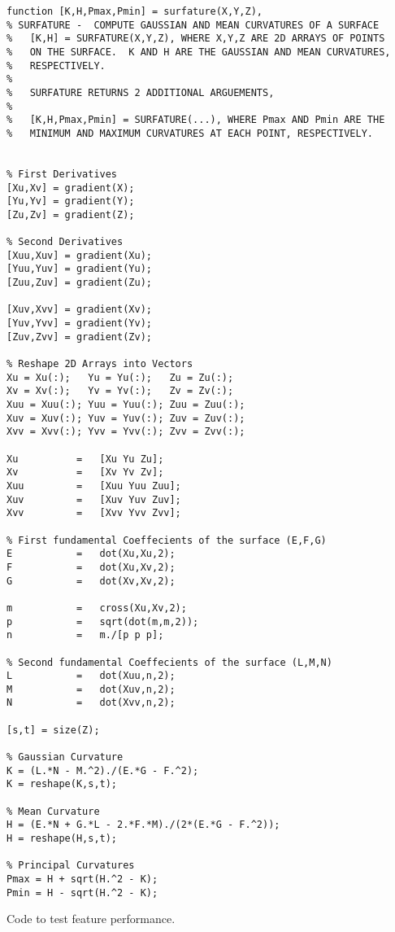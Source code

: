 \begin{verbatim}
function [K,H,Pmax,Pmin] = surfature(X,Y,Z),
% SURFATURE -  COMPUTE GAUSSIAN AND MEAN CURVATURES OF A SURFACE
%   [K,H] = SURFATURE(X,Y,Z), WHERE X,Y,Z ARE 2D ARRAYS OF POINTS
%   ON THE SURFACE.  K AND H ARE THE GAUSSIAN AND MEAN CURVATURES,
%   RESPECTIVELY.
%
%   SURFATURE RETURNS 2 ADDITIONAL ARGUEMENTS,
%
%   [K,H,Pmax,Pmin] = SURFATURE(...), WHERE Pmax AND Pmin ARE THE
%   MINIMUM AND MAXIMUM CURVATURES AT EACH POINT, RESPECTIVELY.


% First Derivatives
[Xu,Xv] = gradient(X);
[Yu,Yv] = gradient(Y);
[Zu,Zv] = gradient(Z);

% Second Derivatives
[Xuu,Xuv] = gradient(Xu);
[Yuu,Yuv] = gradient(Yu);
[Zuu,Zuv] = gradient(Zu);

[Xuv,Xvv] = gradient(Xv);
[Yuv,Yvv] = gradient(Yv);
[Zuv,Zvv] = gradient(Zv);

% Reshape 2D Arrays into Vectors
Xu = Xu(:);   Yu = Yu(:);   Zu = Zu(:); 
Xv = Xv(:);   Yv = Yv(:);   Zv = Zv(:); 
Xuu = Xuu(:); Yuu = Yuu(:); Zuu = Zuu(:); 
Xuv = Xuv(:); Yuv = Yuv(:); Zuv = Zuv(:); 
Xvv = Xvv(:); Yvv = Yvv(:); Zvv = Zvv(:); 

Xu          =   [Xu Yu Zu];
Xv          =   [Xv Yv Zv];
Xuu         =   [Xuu Yuu Zuu];
Xuv         =   [Xuv Yuv Zuv];
Xvv         =   [Xvv Yvv Zvv];

% First fundamental Coeffecients of the surface (E,F,G)
E           =   dot(Xu,Xu,2);
F           =   dot(Xu,Xv,2);
G           =   dot(Xv,Xv,2);

m           =   cross(Xu,Xv,2);
p           =   sqrt(dot(m,m,2));
n           =   m./[p p p]; 

% Second fundamental Coeffecients of the surface (L,M,N)
L           =   dot(Xuu,n,2);
M           =   dot(Xuv,n,2);
N           =   dot(Xvv,n,2);

[s,t] = size(Z);

% Gaussian Curvature
K = (L.*N - M.^2)./(E.*G - F.^2);
K = reshape(K,s,t);

% Mean Curvature
H = (E.*N + G.*L - 2.*F.*M)./(2*(E.*G - F.^2));
H = reshape(H,s,t);

% Principal Curvatures
Pmax = H + sqrt(H.^2 - K);
Pmin = H - sqrt(H.^2 - K);
\end{verbatim}
\clearpage

Code to test feature performance.

